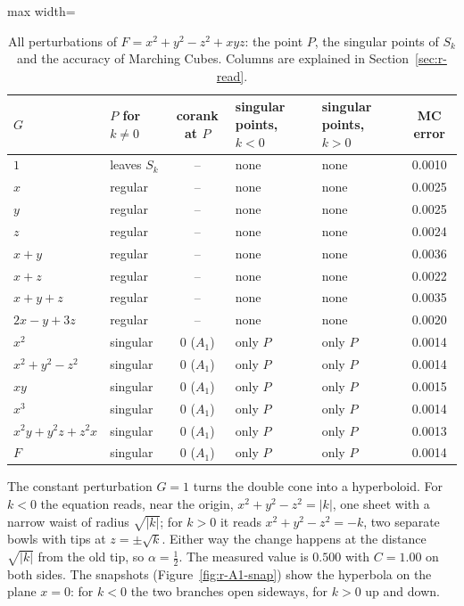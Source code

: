 \documentclass[12pt, a4paper, oneside]{book}
\theoremstyle{plain}
\theoremstyle{definition}
\theoremstyle{remark}
\theoremstyle{definition}
\begin{document}
\begin{table}[!h]
\centering
\footnotesize
\begin{adjustbox}{max width=\textwidth}
\begin{tabular}{l l c l l c}
\toprule
$G$ & $P$ for $k\neq0$ & corank at $P$ & singular points, $k<0$ & singular points, $k>0$ & MC error \\
\midrule
$1$ & leaves $S_k$ & -- & none & none & 0.0010 \\
$x$ & regular & -- & none & none & 0.0025 \\
$y$ & regular & -- & none & none & 0.0025 \\
$z$ & regular & -- & none & none & 0.0024 \\
$x+y$ & regular & -- & none & none & 0.0036 \\
$x+z$ & regular & -- & none & none & 0.0022 \\
$x+y+z$ & regular & -- & none & none & 0.0035 \\
$2x-y+3z$ & regular & -- & none & none & 0.0020 \\
$x^2$ & singular & 0 ($A_1$) & only $P$ & only $P$ & 0.0014 \\
$x^2+y^2-z^2$ & singular & 0 ($A_1$) & only $P$ & only $P$ & 0.0014 \\
$xy$ & singular & 0 ($A_1$) & only $P$ & only $P$ & 0.0015 \\
$x^3$ & singular & 0 ($A_1$) & only $P$ & only $P$ & 0.0014 \\
$x^2y+y^2z+z^2x$ & singular & 0 ($A_1$) & only $P$ & only $P$ & 0.0013 \\
$F$ & singular & 0 ($A_1$) & only $P$ & only $P$ & 0.0014 \\
\bottomrule
\end{tabular}
\end{adjustbox}
\caption[Singular points for $x^2+y^2-z^2+xyz$]{All perturbations of $F=x^2+y^2-z^2+xyz$: the point $P$, the singular points of $S_k$ and the accuracy of Marching Cubes. Columns are explained in Section~\ref{sec:r-read}.}
\label{tab:r-A1-points}
\end{table}

The constant perturbation $G=1$ turns the double cone into a hyperboloid. For $k<0$ the equation reads, near the origin, $x^2+y^2-z^2=|k|$, one sheet with a narrow waist of radius $\sqrt{|k|}$; for $k>0$ it reads $x^2+y^2-z^2=-k$, two separate bowls with tips at $z=\pm\sqrt k$. Either way the change happens at the distance $\sqrt{|k|}$ from the old tip, so $\alpha=\tfrac12$. The measured value is $0.500$ with $C=1.00$ on both sides. The snapshots (Figure~\ref{fig:r-A1-snap}) show the hyperbola on the plane $x=0$: for $k<0$ the two branches open sideways, for $k>0$ up and down.
\end{document}
